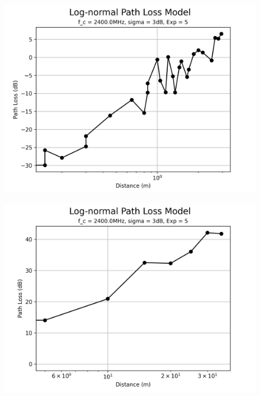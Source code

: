 \begin{figure}[H]
  \centering
  \begin{minipage}[t]{0.5\textwidth}
      \centering
      \includegraphics[width=1\linewidth]{images/research_results/path-loss-lab.png}
      \label{fig:path_loss_lab}
  \end{minipage}\hfill
  \begin{minipage}[t]{0.5\textwidth}
      \centering
      \includegraphics[width=1\linewidth]{images/research_results/path-loss-home.png}
      \label{fig:path_loss_home}
  \end{minipage}
\end{figure}

